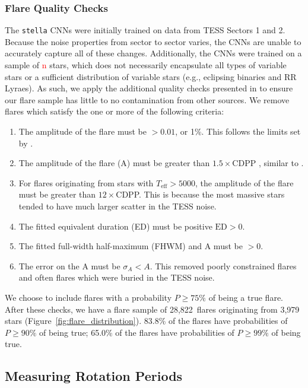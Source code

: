 \documentclass[twocolumn]{aastex631}
\begin{document}
\subsubsection{Flare Quality Checks}

The \texttt{stella} CNNs were initially trained on data from TESS Sectors 1 and 2.
Because the noise properties from sector to sector varies, the CNNs are unable to accurately
capture all of these changes. Additionally, the CNNs were trained on a sample of \textcolor{red}{n}
stars, which does not necessarily encapsulate all types of variable stars or a sufficient distribution
of variable stars (e.g., eclipsing binaries and RR Lyraes). As such, we apply the additional
quality checks presented in \cite{Feinstein22} to ensure our flare sample has little to no contamination
from other sources. We remove flares which satisfy the one or more of the following criteria:

\begin{enumerate}
  \item The amplitude of the flare must be $> 0.01$, or 1\%. This follows the limits set by
        \cite{feinstein20}.
  \item The amplitude of the flare (A) must be greater than $1.5\times$CDPP \citep[Combined Differential
        Photometric Precision;][]{christiansen12}, similar to \cite{Feinstein22}.
  \item For flares originating from stars with $T_\textrm{eff} > 5000$, the amplitude of the flare
        must be greater than $12\times$CDPP. This is because the most massive stars tended to have
        much larger scatter in the TESS noise.
  \item The fitted equivalent duration (ED) must be positive $\textrm{ED} > 0$.
  \item The fitted full-width half-maximum (FHWM) and A must be $> 0$.
  \item The error on the A must be $\sigma_A < A$. This removed poorly constrained flares and often
        flares which were buried in the TESS noise.
\end{enumerate}

We choose to include flares with a probability $P \geq 75\%$ of being
a true flare. After these checks, we have a flare sample of 28,822~flares originating
from 3,979 stars (Figure~\ref{fig:flare_distribution}). 83.8\% of the flares have
probabilities of $P \geq 90\%$ of being true; 65.0\% of the flares have probabilities
of $P \geq 99\%$ of being true.

\subsection{Measuring Rotation Periods}
\end{document}
